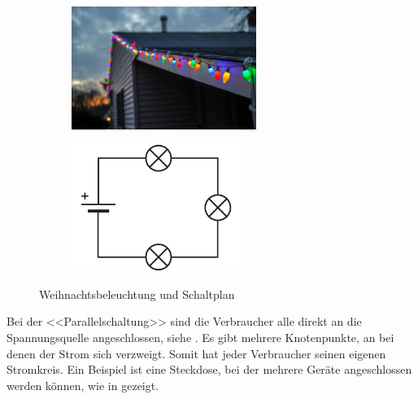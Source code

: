 \begin{figure}[h!]
\centering
    \begin{subfigure}[b]{0.46\textwidth}
    \centering
    \includegraphics[width=6cm]{_images/weihnachtsbeleuchtung}
    \caption{\label{fig:christmaslights}}
    \end{subfigure}
    \quad
    \begin{subfigure}[b]{0.46\textwidth}
    \centering
    \includegraphics[width=5.5cm]{_images/serienschaltung_schaltplan}
    \caption{\label{fig:series_schematic}}
    \end{subfigure}

    \caption{Weihnachtsbeleuchtung und Schaltplan}
\end{figure}



Bei der <<Parallelschaltung>> sind die Verbraucher alle direkt an
die Spannungsquelle angeschlossen, siehe .
Es gibt mehrere Knotenpunkte, an bei denen der Strom sich verzweigt.
Somit hat jeder Verbraucher seinen eigenen Stromkreis.
Ein Beispiel ist eine Steckdose, bei der mehrere Geräte angeschlossen werden
können, wie in  gezeigt.

